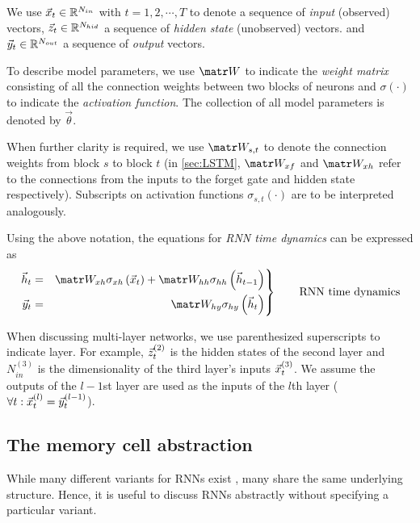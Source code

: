 We use $\vec{x}_t \in \mathbb{R}^{N_{in}}$ with $t=1,2,\cdots,T$ to denote a sequence of
\emph{input} (\ie observed) vectors, $\vec{z}_t \in \mathbb{R}^{N_{hid}}$ a sequence of
\emph{hidden state} (\ie unobserved) vectors. and $\vec{y}_t \in \mathbb{R}^{N_{out}}$ a
sequence of \emph{output} vectors.

To describe model parameters, we use $\W$ to indicate the \emph{weight matrix}
consisting of all the connection weights between two blocks of neurons
and $\sigma(\cdot)$ to indicate the \emph{activation function}. The collection
of all model parameters is denoted by $\vec{\theta}$.

When further clarity is required, we use $\W_{s,t}$ to denote the connection
weights from block $s$ to block $t$ (\ie in \cref{sec:LSTM}, $\W_{xf}$ and
$\W_{xh}$ refer to the connections from the inputs to the forget gate and
hidden state respectively). Subscripts on activation functions $\sigma_{s,t}(\cdot)$
are to be interpreted analogously.

Using the above notation, the equations for \emph{RNN time dynamics} can be expressed as
\begin{equation}\label{eq:rnn-dynamics}
 \left.\begin{aligned}
          \h_t &=& \W_{xh} \sigma_{xh} \left( \x_t \right) + \W_{hh} \sigma_{hh} \left( \h_{t-1} \right)\\
          \y_t &=& \W_{hy} \sigma_{hy} \left( \h_t \right)
       \end{aligned}
 \right\}
 \qquad \text{RNN time dynamics}
\end{equation}

When discussing multi-layer networks, we use parenthesized superscripts to
indicate layer. For example, $\vec{z}^{(2)}_t$ is the hidden states of the second
layer and $N^{(3)}_{in}$ is the dimensionality of the third layer's inputs
$\vec{x}^{(3)}_t$. We assume the outputs of the $l-1$st layer are used as the inputs
of the $l$th layer (\ie $\forall t: \vec{x}^{(l)}_t = \vec{y}^{(l-1)}_t$).

\subsection{The memory cell abstraction}

While many different variants for RNNs exist
\citep{elman1990finding,jordan1997serial,hochreiter1997long,cho2014learning,Koutnik2014,Mikolov2015},
many share the same underlying structure. Hence, it is useful to discuss RNNs
abstractly without specifying a particular variant.

